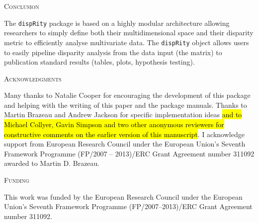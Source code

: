 \documentclass[12pt,letterpaper]{article}
\renewcommand{\section}[1]{%
\bigskip
\begin{center}
\begin{Large}
\normalfont\scshape #1
\medskip
\end{Large}
\end{center}}
\newcommand{\disp}{\texttt{dispRity} }
\begin{document}
\section{Conclusion}
The \disp package is based on a highly modular architecture allowing researchers to simply define both their multidimensional space and their disparity metric to efficiently analyse multivariate data.
The \disp object allows users to easily pipeline disparity analysis from the data input (the matrix) to publication standard results (tables, plots, hypothesis testing).


\section{Acknowledgments}
Many thanks to Natalie Cooper for encouraging the development of this package and helping with the writing of this paper and the package manuals.
Thanks to Martin Brazeau and Andrew Jackson for specific implementation ideas \hl{and to Michael Collyer, Gavin Simpson and two other anonymous reviewers for constructive comments on the earlier version of this manuscript}. %
I acknowledge support from European Research Council under the European Union's Seventh Framework Programme (FP/2007 – 2013)/ERC Grant Agreement number 311092 awarded to Martin D. Brazeau.


\section{Funding}
This work was funded by the European Research Council under the European Union's Seventh Framework Programme (FP/2007–2013)/ERC Grant Agreement number 311092.



\end{document}
